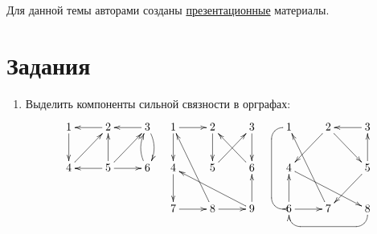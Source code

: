 Для данной темы авторами созданы \href{../presentation/ch09.4/main.beamer.pdf}{презентационные} материалы.




\section*{Задания}

\begin{enumerate}
    \item Выделить компоненты сильной связности в орграфах:
    \[
        \begin{tabular}{ccc}
            {\xymatrix{
                1 \ar@{->}[d]
                    &2 \ar@{->}[l]
                        &3 \ar@{->}[l] \ar@{->}@/^/[d]
                            \\
                4 \ar@{->}[ur]
                    &5 \ar@{->}[u] \ar@{->}[l] \ar@{->}[r] \ar@{->}[ur]
                        &6 \ar@{->}@/^/[u]
            }}
            &
            {\xymatrix{
                1 \ar@{->}[d] \ar@{->}[r]
                    &2 \ar@{->}[d]
                        &3 \ar@{->}[d]
                            \\
                4 \ar@{->}[d]
                    &5 \ar@{->}[ur]
                        &6 \ar@{->}[ul]
                            \\
                7 \ar@{->}[r]
                    &8 \ar@{->}[r] \ar@{->}[uul]
                        &9 \ar@{->}[ull] \ar@{->}[u]
            }}
            &
            {\xymatrix{
                1 \ar@{->}`l[d]`[dd][dd]
                    &2 \ar@{->}[dr] \ar@{->}[dl]
                        &3 \ar@{->}[l]
                            \\
                4 \ar@{->}[drr]
                    &*{}
                        &5 \ar@{->}[dl] \ar@{->}[u]
                            \\
                6 \ar@{->}[u] \ar@{->}[r]
                    &7 \ar@{->}[uul]
                        &8 \ar@{-<}`d[ll]`[ll][ll]
            }}
        \end{tabular}
\]
\end{enumerate}
